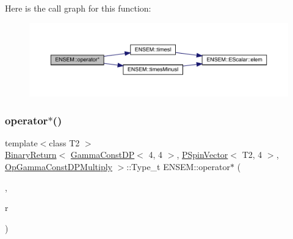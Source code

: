 Here is the call graph for this function\+:\nopagebreak
\begin{figure}[H]
\begin{center}
\leavevmode
\includegraphics[width=350pt]{dd/d6d/group__primspinvector_ga62ad9e5b7456ea7e7aeb04de82e03545_cgraph}
\end{center}
\end{figure}
\mbox{\label{group__primspinvector_ga8651c7707116b78fc19958171acaabfd}} 
\subsubsection{\texorpdfstring{operator$\ast$()}{operator*()}\hspace{0.1cm}{\footnotesize\ttfamily [21/32]}}
{\footnotesize\ttfamily template$<$class T2 $>$ \\
\mbox{\hyperlink{structENSEM_1_1BinaryReturn}{Binary\+Return}}$<$ \mbox{\hyperlink{classENSEM_1_1GammaConstDP}{Gamma\+Const\+DP}}$<$ 4, 4 $>$, \mbox{\hyperlink{classENSEM_1_1PSpinVector}{P\+Spin\+Vector}}$<$ T2, 4 $>$, \mbox{\hyperlink{structENSEM_1_1OpGammaConstDPMultiply}{Op\+Gamma\+Const\+D\+P\+Multiply}} $>$\+::Type\+\_\+t E\+N\+S\+E\+M\+::operator$\ast$ (\begin{DoxyParamCaption}\item[{const \mbox{\hyperlink{classENSEM_1_1GammaConstDP}{Gamma\+Const\+DP}}$<$ 4, 4 $>$ \&}]{,  }\item[{const \mbox{\hyperlink{classENSEM_1_1PSpinVector}{P\+Spin\+Vector}}$<$ T2, 4 $>$ \&}]{r }\end{DoxyParamCaption})\hspace{0.3cm}{\ttfamily [inline]}}

